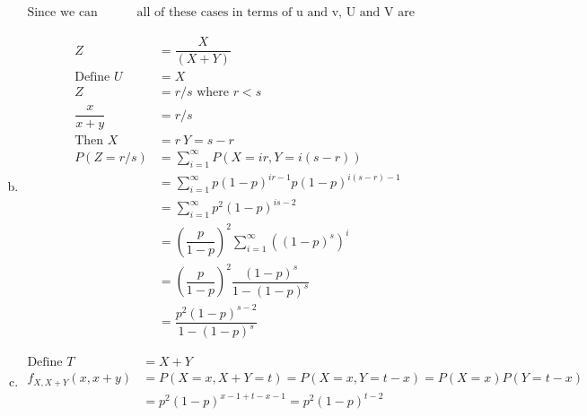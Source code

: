 \documentclass{article}
\begin{document}
\begin{flushleft}
\begin{enumerate}[(a)]
\begin{align*}
\text{Since we can factor}&\text{ all of these cases in terms of u and v, U and V are independent }
\end{align*}
\item 
\begin{align*}
Z&=\dfrac{X}{(X+Y)}\\
\text{Define } U&=X\\
Z&=r/s \text{ where } r<s\\
\dfrac{x}{x+y}&=r/s\\
\text{Then } X&=r \ Y=s-r\\
P(Z=r/s)&=\sum_{i=1}^{\infty}P(X=ir,Y=i(s-r))\\
&=\sum_{i=1}^{\infty}p(1-p)^{ir-1}p(1-p)^{i(s-r)-1}\\
&=\sum_{i=1}^{\infty}p^2(1-p)^{is-2}\\
&=\left(\dfrac{p}{1-p}\right)^2\sum_{i=1}^{\infty}((1-p)^s)^i\\
&=\left(\dfrac{p}{1-p}\right)^2 \dfrac{(1-p)^s}{1-(1-p)^s}\\
&=\dfrac{p^2(1-p)^{s-2}}{1-(1-p)^s}
\end{align*}
\item
\begin{align*}
\text{Define } T&=X+Y\\
f_{X,X+Y}(x,x+y)&=P(X=x,X+Y=t)=P(X=x,Y=t-x)=P(X=x)P(Y=t-x)\\
&=p^2(1-p)^{x-1+t-x-1}=p^2(1-p)^{t-2}
\end{align*}
\end{enumerate}

\end{flushleft}
\end{document}
